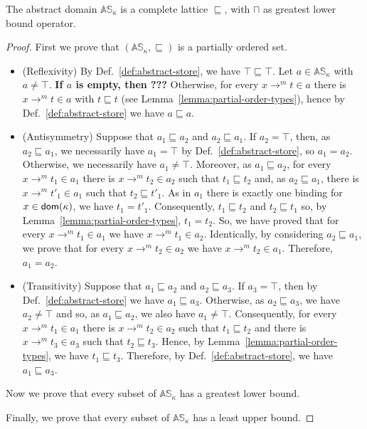 \begin{proposition}\label{prop:complete_lattice}
  The abstract domain $\mathbb{AS}_\kappa$ is a complete lattice \wrt $\sqsubseteq$,
  with $\sqcap$ as greatest lower bound operator.
\end{proposition}
\begin{proof}
  First we prove that $(\mathbb{AS}_\kappa,\sqsubseteq)$ is a partially
  ordered set.
  \begin{itemize}
    \item (Reflexivity) By Def.~\ref{def:abstract-store}, we have
    $\top\sqsubseteq \top$. Let $a\in\mathbb{AS}_\kappa$ with $a\neq \top$.
    {\bf\color{red}If $a$ is empty, then ???}
    Otherwise, for every $x\to^mt\in a$ there is $x\to^mt\in a$ with
    $t\sqsubseteq t$ (see Lemma~\ref{lemma:partial-order-types}), hence by
    Def.~\ref{def:abstract-store} we have $a\sqsubseteq a$.
    \item (Antisymmetry) Suppose that $a_1 \sqsubseteq a_2$ and
    $a_2 \sqsubseteq a_1$. If $a_2=\top$, then, as $a_2 \sqsubseteq a_1$,
    we necessarily have $a_1=\top$ by Def.~\ref{def:abstract-store}, so
    $a_1=a_2$. Otherwise, we necessarily
    have $a_1\neq\top$. Moreover, as $a_1 \sqsubseteq a_2$, for every
    $x\to^mt_1\in a_1$ there is $x\to^mt_2\in a_2$ such that
    $t_1\sqsubseteq t_2$ and, as $a_2 \sqsubseteq a_1$, there is
    $x\to^mt'_1\in a_1$ such that $t_2\sqsubseteq t'_1$.
    As in $a_1$ there is exactly one binding for $x\in\mathsf{dom}(\kappa)$, we have
    $t_1=t'_1$. Consequently, $t_1\sqsubseteq t_2$ and $t_2\sqsubseteq t_1$
    so, by Lemma~\ref{lemma:partial-order-types}, $t_1=t_2$. So, we have
    proved that for every $x\to^mt_1\in a_1$ we have $x\to^mt_1\in a_2$.
    Identically, by considering $a_2 \sqsubseteq a_1$, we prove that
    for every $x\to^mt_2\in a_2$ we have $x\to^mt_2\in a_1$.
    Therefore, $a_1=a_2$.
    \item (Transitivity) Suppose that $a_1 \sqsubseteq a_2$ and
    $a_2 \sqsubseteq a_3$. If $a_3=\top$, then by Def.~\ref{def:abstract-store}
    we have $a_1\sqsubseteq a_3$. Otherwise, as $a_2 \sqsubseteq a_3$,
    we have $a_2\neq\top$ and so, as $a_1 \sqsubseteq a_2$, we also have
    $a_1\neq\top$. Consequently, for every $x\to^mt_1\in a_1$ there is
    $x\to^mt_2\in a_2$ such that $t_1\sqsubseteq t_2$ and there is
    $x\to^mt_3\in a_3$ such that $t_2\sqsubseteq t_3$. Hence, by
    Lemma~\ref{lemma:partial-order-types}, we have $t_1\sqsubseteq t_3$.
    Therefore, by Def.~\ref{def:abstract-store}, we have $a_1\sqsubseteq a_3$.
  \end{itemize}

  Now we prove that every subset of $\mathbb{AS}_\kappa$ has a greatest
  lower bound.

  Finally, we prove that every subset of $\mathbb{AS}_\kappa$ has a least
  upper bound.
\end{proof}

